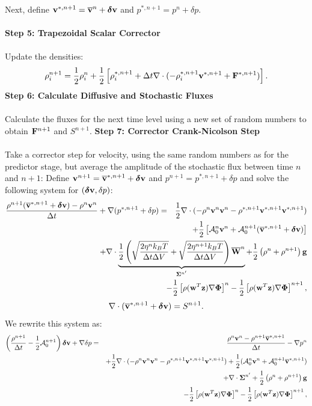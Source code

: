\documentclass[final]{siamltex}
\def\Fb {{\bf F}}
\def\gb {{\bf g}}
\def\vb {{\bf v}}
\def\wb {{\bf w}}
\def\Wb {{\bf W}}
\def\zb {{\bf z}}
\def\deltab {\boldsymbol{\delta}}
\def\Phib   {\boldsymbol{\Phi}}
\def\Sigmab {\boldsymbol{\Sigma}}
\def\half   {\frac{1}{2}}
\begin{document}
Next, define $\vb^{*,n+1} = \overline\vb^n + \deltab\vb$ and $p^{*,n+1} = p^n + \delta p$.\\ \\
{\bf Step 5: Trapezoidal Scalar Corrector}\\ \\
Update the densities:
\begin{equation}
\rho_i^{n+1} = \half\rho_i^n + \half\left[\rho_i^{*,n+1} + \Delta t\nabla\cdot(-\rho_i^{*,n+1}\vb^{*,n+1} + \Fb^{*,n+1})\right].
\end{equation}
{\bf Step 6: Calculate Diffusive and Stochastic Fluxes}\\ \\
Calculate the fluxes for the next time level using a new set of random numbers to obtain $\Fb^{n+1}$ and $S^{n+1}$.
{\bf Step 7: Corrector Crank-Nicolson Step}\\ \\
Take a corrector step for velocity, using the same random numbers as for the predictor
stage, but average the amplitude of the stochastic flux between time $n$ and $n+1$:
Define $\vb^{n+1} = \overline\vb^{*,n+1} + \deltab\vb$ and $p^{n+1} = p^{*,n+1} + \delta p$ and
solve the following system for $(\deltab\vb,\delta p)$:
\begin{eqnarray}
\frac{\rho^{n+1}(\overline\vb^{*,n+1} + \deltab\vb) - \rho^n\vb^n}{\Delta t} + \nabla(p^{*,n+1}+\delta p) &=& \half\nabla\cdot(-\rho^n\vb^n\vb^n - \rho^{*,n+1}\vb^{*,n+1}\vb^{*,n+1})\nonumber\\
&&\hspace{-1.5in}+ \half\left[\mathcal{A}_0^n\vb^n + \mathcal{A}_0^{n+1}(\overline\vb^{*,n+1} + \deltab\vb)\right]\nonumber\\
&&\hspace{-1.5in}+ \nabla\cdot\underbrace{\half\left(\sqrt{\frac{2\eta^n k_B T}{\Delta t\Delta V}} + \sqrt{\frac{2\eta^{n+1} k_B T}{\Delta t\Delta V}}\right)\overline\Wb^n}_{\Sigmab^{n'}} + \half\left(\rho^n+\rho^{n+1}\right)\gb\nonumber\\
&&\hspace{-1.5in} - \half\left[\rho(\wb^T\zb)\nabla\Phib\right]^n - \half\left[\rho(\wb^T\zb)\nabla\Phib\right]^{n+1},
\end{eqnarray}
\begin{equation}
\nabla\cdot(\overline\vb^{*,n+1} + \deltab\vb) = S^{n+1}.
\end{equation}
We rewrite this system as:
\begin{eqnarray}
\left(\frac{\rho^{n+1}}{\Delta t} - \half\mathcal{A}_0^{n+1}\right)\deltab\vb + \nabla\delta p &=& \frac{\rho^n\vb^n-\rho^{n+1}\overline\vb^{*,n+1}}{\Delta t} -\nabla p^n\nonumber\\
&&+ \half\nabla\cdot(-\rho^n\vb^n\vb^n - \rho^{*,n+1}\vb^{*,n+1}\vb^{*,n+1}) + \half(\mathcal{A}_0^n\vb^n + \mathcal{A}_0^{n+1}\overline\vb^{*,n+1} )\nonumber\\
&&+ \nabla\cdot\Sigmab^{n'} + \half\left(\rho^n+\rho^{n+1}\right)\gb\nonumber\\
&&- \half\left[\rho(\wb^T\zb)\nabla\Phib\right]^n - \half\left[\rho(\wb^T\zb)\nabla\Phib\right]^{n+1},
\end{eqnarray}
\end{document}
